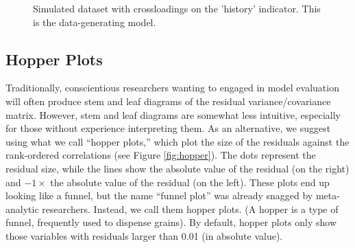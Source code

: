 \documentclass[
  english,
  doc]{apa6}
\begin{document}
\begin{figure}
\begin{center}
\label{fig:force}
\caption{Simulated dataset with crossloadings on the 'history' indicator. This is the data-generating model.}
\end{center}
\end{figure}

\hypertarget{hopper-plots}{%
\subsection{Hopper Plots}\label{hopper-plots}}

Traditionally, conscientious researchers wanting to engaged in model evaluation will often produce stem and leaf diagrams of the residual variance/covariance matrix. However, stem and leaf diagrams are somewhat less intuitive, especially for those without experience interpreting them. As an alternative, we suggest using what we call ``hopper plots,'' which plot the size of the residuals against the rank-ordered correlations (see Figure \ref{fig:hopper}). The dots represent the residual size, while the lines show the absolute value of the residual (on the right) and \(-1\times\) the absolute value of the residual (on the left). These plots end up looking like a funnel, but the name ``funnel plot'' was already snagged by meta-analytic researchers. Instead, we call them hopper plots. (A hopper is a type of funnel, frequently used to dispense grains). By default, hopper plots only show those variables with residuals larger than 0.01 (in absolute value).
\end{document}
